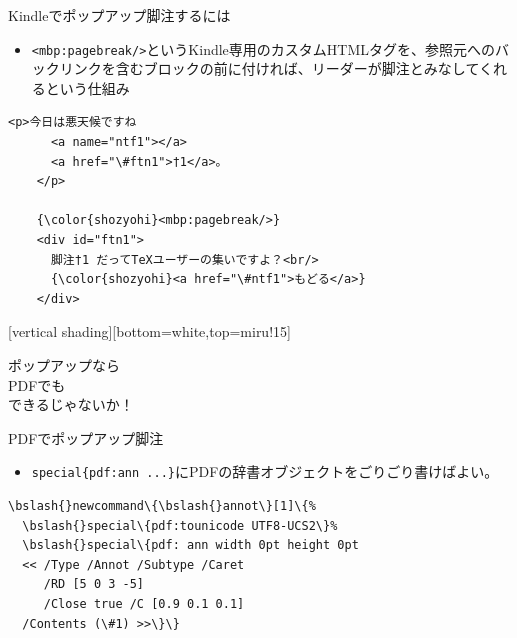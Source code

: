 \documentclass[14pt,dvipdfmx,uplatex]{beamer}
\begin{document}
\begin{frame}[fragile]{\inhibitglue Kindleでポップアップ脚注するには}
  \sffamily
  \begin{itemize}
    \item \texttt{<mbp:pagebreak/>}というKindle専用のカスタムHTMLタグを、参照元へのバックリンクを含むブロックの前に付ければ、リーダーが脚注とみなしてくれるという仕組み
  \end{itemize}
  \begin{tcolorbox}
  \begin{Verbatim}[commandchars=\\\{\}, breaklines=true, breakanywhere=true]
    <p>今日は悪天候ですね
      <a name="ntf1"></a>
      <a href="\#ftn1">†1</a>。
    </p>
    
    {\color{shozyohi}<mbp:pagebreak/>}
    <div id="ftn1">
      脚注†1 だってTeXユーザーの集いですよ？<br/>
      {\color{shozyohi}<a href="\#ntf1">もどる</a>}
    </div>
  \end{Verbatim}
  \end{tcolorbox}
\end{frame}

[vertical shading][bottom=white,top=miru!15]

\begin{frame}[plain]
  \begin{center}
    \color{miru}\yasagoth
    ポップアップなら\\
    PDFでも\\
    できるじゃないか！
  \end{center}
\end{frame}

\begin{frame}[fragile]{\inhibitglue PDFでポップアップ脚注}
  \sffamily
  \begin{itemize}
    \item \texttt{\bslash special\{pdf:ann ...\}}にPDFの辞書オブジェクトをごりごり書けばよい。
  \end{itemize}
  \begin{tcolorbox}
  \begin{Verbatim}[commandchars=\\\{\}, breaklines=true, breakanywhere=true]
\bslash{}newcommand\{\bslash{}annot\}[1]\{%
  \bslash{}special\{pdf:tounicode UTF8-UCS2\}%
  \bslash{}special\{pdf: ann width 0pt height 0pt
  << /Type /Annot /Subtype /Caret 
     /RD [5 0 3 -5] 
     /Close true /C [0.9 0.1 0.1]
  /Contents (\#1) >>\}\}
  \end{Verbatim}
  \end{tcolorbox}
\end{frame}
\end{document}
